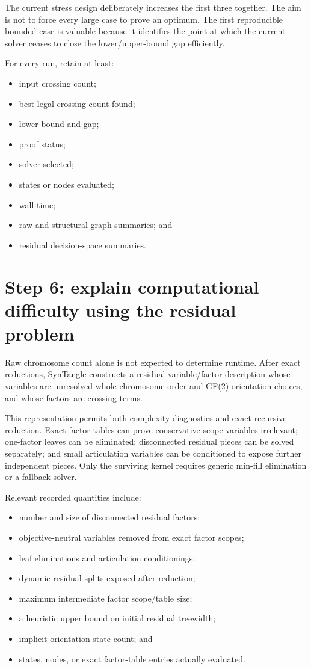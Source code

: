 \documentclass[11pt]{article}
\begin{document}
The current stress design deliberately increases the first three together.
The aim is not to force every large case to prove an optimum.  The first
reproducible bounded case is valuable because it identifies the point at which
the current solver ceases to close the lower/upper-bound gap efficiently.

For every run, retain at least:

\begin{itemize}
  \item input crossing count;
  \item best legal crossing count found;
  \item lower bound and gap;
  \item proof status;
  \item solver selected;
  \item states or nodes evaluated;
  \item wall time;
  \item raw and structural graph summaries; and
  \item residual decision-space summaries.
\end{itemize}

\section{Step 6: explain computational difficulty using the residual problem}

Raw chromosome count alone is not expected to determine runtime.  After exact
reductions, SynTangle constructs a residual variable/factor description whose
variables are unresolved whole-chromosome order and GF(2) orientation choices,
and whose factors are crossing terms.

This representation permits both complexity diagnostics and exact recursive
reduction.  Exact factor tables can prove conservative scope variables
irrelevant; one-factor leaves can be eliminated; disconnected residual pieces
can be solved separately; and small articulation variables can be conditioned
to expose further independent pieces.  Only the surviving kernel requires
generic min-fill elimination or a fallback solver.

Relevant recorded quantities include:

\begin{itemize}
  \item number and size of disconnected residual factors;
  \item objective-neutral variables removed from exact factor scopes;
  \item leaf eliminations and articulation conditionings;
  \item dynamic residual splits exposed after reduction;
  \item maximum intermediate factor scope/table size;
  \item a heuristic upper bound on initial residual treewidth;
  \item implicit orientation-state count; and
  \item states, nodes, or exact factor-table entries actually evaluated.
\end{itemize}
\end{document}
